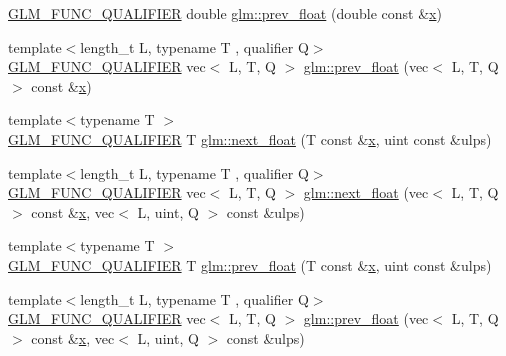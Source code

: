 \begin{DoxyCompactItemize}
\item 
\mbox{\hyperlink{setup_8hpp_a33fdea6f91c5f834105f7415e2a64407}{G\+L\+M\+\_\+\+F\+U\+N\+C\+\_\+\+Q\+U\+A\+L\+I\+F\+I\+ER}} double \mbox{\hyperlink{namespaceglm_a82cdd5674b80569f118b33a6a327c9bd}{glm\+::prev\+\_\+float}} (double const \&\mbox{\hyperlink{_s_d_l__opengl_8h_ad0e63d0edcdbd3d79554076bf309fd47}{x}})
\item 
{\footnotesize template$<$length\+\_\+t L, typename T , qualifier Q$>$ }\\\mbox{\hyperlink{setup_8hpp_a33fdea6f91c5f834105f7415e2a64407}{G\+L\+M\+\_\+\+F\+U\+N\+C\+\_\+\+Q\+U\+A\+L\+I\+F\+I\+ER}} vec$<$ L, T, Q $>$ \mbox{\hyperlink{namespaceglm_a7269234e5e58024e74a177fee5e42286}{glm\+::prev\+\_\+float}} (vec$<$ L, T, Q $>$ const \&\mbox{\hyperlink{_s_d_l__opengl_8h_ad0e63d0edcdbd3d79554076bf309fd47}{x}})
\item 
{\footnotesize template$<$typename T $>$ }\\\mbox{\hyperlink{setup_8hpp_a33fdea6f91c5f834105f7415e2a64407}{G\+L\+M\+\_\+\+F\+U\+N\+C\+\_\+\+Q\+U\+A\+L\+I\+F\+I\+ER}} T \mbox{\hyperlink{namespaceglm_ae4ffae05b7502be722f522c04f7e42ac}{glm\+::next\+\_\+float}} (T const \&\mbox{\hyperlink{_s_d_l__opengl_8h_ad0e63d0edcdbd3d79554076bf309fd47}{x}}, uint const \&ulps)
\item 
{\footnotesize template$<$length\+\_\+t L, typename T , qualifier Q$>$ }\\\mbox{\hyperlink{setup_8hpp_a33fdea6f91c5f834105f7415e2a64407}{G\+L\+M\+\_\+\+F\+U\+N\+C\+\_\+\+Q\+U\+A\+L\+I\+F\+I\+ER}} vec$<$ L, T, Q $>$ \mbox{\hyperlink{namespaceglm_ab7a0495271c3424711ced7b771afbdd1}{glm\+::next\+\_\+float}} (vec$<$ L, T, Q $>$ const \&\mbox{\hyperlink{_s_d_l__opengl_8h_ad0e63d0edcdbd3d79554076bf309fd47}{x}}, vec$<$ L, uint, Q $>$ const \&ulps)
\item 
{\footnotesize template$<$typename T $>$ }\\\mbox{\hyperlink{setup_8hpp_a33fdea6f91c5f834105f7415e2a64407}{G\+L\+M\+\_\+\+F\+U\+N\+C\+\_\+\+Q\+U\+A\+L\+I\+F\+I\+ER}} T \mbox{\hyperlink{namespaceglm_a87ac8f75510274e112fe8512cfaa6935}{glm\+::prev\+\_\+float}} (T const \&\mbox{\hyperlink{_s_d_l__opengl_8h_ad0e63d0edcdbd3d79554076bf309fd47}{x}}, uint const \&ulps)
\item 
{\footnotesize template$<$length\+\_\+t L, typename T , qualifier Q$>$ }\\\mbox{\hyperlink{setup_8hpp_a33fdea6f91c5f834105f7415e2a64407}{G\+L\+M\+\_\+\+F\+U\+N\+C\+\_\+\+Q\+U\+A\+L\+I\+F\+I\+ER}} vec$<$ L, T, Q $>$ \mbox{\hyperlink{namespaceglm_aa08bb35b4dfd396a49111aedeb6f06b1}{glm\+::prev\+\_\+float}} (vec$<$ L, T, Q $>$ const \&\mbox{\hyperlink{_s_d_l__opengl_8h_ad0e63d0edcdbd3d79554076bf309fd47}{x}}, vec$<$ L, uint, Q $>$ const \&ulps)

\end{DoxyCompactItemize}
